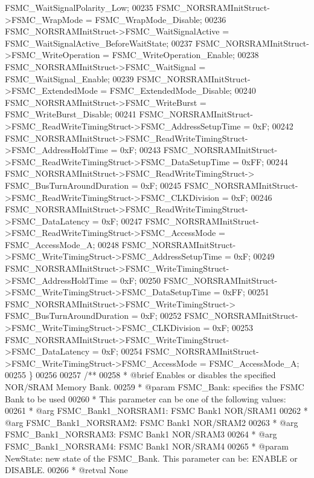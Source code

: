 \begin{DoxyCode}
      FSMC_WaitSignalPolarity_Low;
00235   FSMC\_NORSRAMInitStruct->FSMC_WrapMode = FSMC_WrapMode_Disable;
00236   FSMC\_NORSRAMInitStruct->FSMC_WaitSignalActive = 
      FSMC_WaitSignalActive_BeforeWaitState;
00237   FSMC\_NORSRAMInitStruct->FSMC_WriteOperation = FSMC_WriteOperation_Enable;
00238   FSMC\_NORSRAMInitStruct->FSMC_WaitSignal = FSMC_WaitSignal_Enable;
00239   FSMC\_NORSRAMInitStruct->FSMC_ExtendedMode = FSMC_ExtendedMode_Disable;
00240   FSMC\_NORSRAMInitStruct->FSMC_WriteBurst = FSMC_WriteBurst_Disable;
00241   FSMC\_NORSRAMInitStruct->FSMC_ReadWriteTimingStruct->FSMC_AddressSetupTime = 0xF;
00242   FSMC\_NORSRAMInitStruct->FSMC_ReadWriteTimingStruct->FSMC_AddressHoldTime = 0xF;
00243   FSMC\_NORSRAMInitStruct->FSMC_ReadWriteTimingStruct->FSMC_DataSetupTime = 0xFF;
00244   FSMC\_NORSRAMInitStruct->FSMC_ReadWriteTimingStruct->
      FSMC_BusTurnAroundDuration = 0xF;
00245   FSMC\_NORSRAMInitStruct->FSMC_ReadWriteTimingStruct->FSMC_CLKDivision = 0xF;
00246   FSMC\_NORSRAMInitStruct->FSMC_ReadWriteTimingStruct->FSMC_DataLatency = 0xF;
00247   FSMC\_NORSRAMInitStruct->FSMC_ReadWriteTimingStruct->FSMC_AccessMode = 
      FSMC_AccessMode_A;
00248   FSMC\_NORSRAMInitStruct->FSMC_WriteTimingStruct->FSMC_AddressSetupTime = 0xF;
00249   FSMC\_NORSRAMInitStruct->FSMC_WriteTimingStruct->FSMC_AddressHoldTime = 0xF;
00250   FSMC\_NORSRAMInitStruct->FSMC_WriteTimingStruct->FSMC_DataSetupTime = 0xFF;
00251   FSMC\_NORSRAMInitStruct->FSMC_WriteTimingStruct->
      FSMC_BusTurnAroundDuration = 0xF;
00252   FSMC\_NORSRAMInitStruct->FSMC_WriteTimingStruct->FSMC_CLKDivision = 0xF;
00253   FSMC\_NORSRAMInitStruct->FSMC_WriteTimingStruct->FSMC_DataLatency = 0xF;
00254   FSMC\_NORSRAMInitStruct->FSMC_WriteTimingStruct->FSMC_AccessMode = 
      FSMC_AccessMode_A;
00255 \}
00256 
00257 \textcolor{comment}{/**}
00258 \textcolor{comment}{  * @brief  Enables or disables the specified NOR/SRAM Memory Bank.}
00259 \textcolor{comment}{  * @param  FSMC\_Bank: specifies the FSMC Bank to be used}
00260 \textcolor{comment}{  *          This parameter can be one of the following values:}
00261 \textcolor{comment}{  *            @arg FSMC\_Bank1\_NORSRAM1: FSMC Bank1 NOR/SRAM1  }
00262 \textcolor{comment}{  *            @arg FSMC\_Bank1\_NORSRAM2: FSMC Bank1 NOR/SRAM2 }
00263 \textcolor{comment}{  *            @arg FSMC\_Bank1\_NORSRAM3: FSMC Bank1 NOR/SRAM3 }
00264 \textcolor{comment}{  *            @arg FSMC\_Bank1\_NORSRAM4: FSMC Bank1 NOR/SRAM4 }
00265 \textcolor{comment}{  * @param  NewState: new state of the FSMC\_Bank. This parameter can be: ENABLE or DISABLE.}
00266 \textcolor{comment}{  * @retval None}

\end{DoxyCode}
